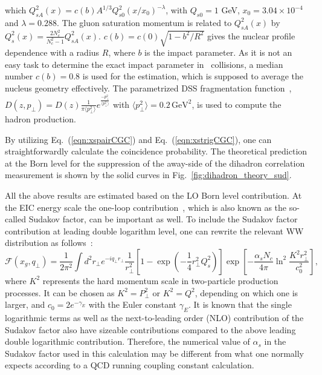 which $Q^{2}_{sA}(x)=c(b)A^{1/3}Q^{2}_{s0}(x/x_{0})^{-\lambda}$, with $Q_{s0}=1$
GeV, $x_{0}=3.04\times 10^{-4}$ and  $\lambda=0.288$. The gluon saturation
momentum is related to $Q^{2}_{sA}(x)$ by
$Q_s^2(x)=\frac{2N_c^2}{N_c^2-1}Q^{2}_{sA}(x)$. $c(b)=c(0)\sqrt{1-b^{2}/R^{2}}$
gives the nuclear profile dependence with a radius $R$, where $b$ is the impact
parameter. As it is not an easy task to determine the exact impact parameter in \eA\
collisions, a median number $c(b)=0.8$ is used for the estimation,
which is supposed to average the nucleus geometry effectively. The parametrized
DSS fragmentation function~\cite{deFlorian:2007aj},
$D(z,p_{\perp})=D(z)\frac{1}{\pi\langle
p^{2}_{\perp}\rangle}e^{\frac{-p_{\perp}^{2}}{\langle p^{2}_{\perp}\rangle}}$ with
$\langle p^{2}_{\perp}\rangle=0.2 \, \mathrm{GeV}^{2}$, is used to compute the hadron
production.

By utilizing Eq.~(\ref{eqn:xspairCGC}) and Eq.~(\ref{eqn:xstrigCGC}), one can
straightforwardly calculate the coincidence probability. The theoretical
prediction at the Born level for the suppression of the away-side of the
dihadron correlation measurement is shown by the solid curves in
Fig.~\ref{fig:dihadron_theory_sud}.

All the above results are estimated based on the LO Born level
contribution. At the EIC energy scale the one-loop
contribution~\cite{Mueller:2012uf}, which is also known as the so-called Sudakov
factor, can be important as well. To include the Sudakov factor contribution at
leading double logarithm level, one can rewrite the relevant WW distribution as
follows~\cite{Mueller:2013wwa}:
\begin{equation}
\mathcal{F}(x_{g}, q_{\perp}) =
\frac{1}{2\pi^{2}} \int d^{2}r_{\perp} e^{-iq_{\perp}r_{\perp}}
\frac{1}{r^{2}_{\perp}}[1-\exp(-\frac{1}{4}r^{2}_{\perp}Q^{2}_{s})]
\exp[-\frac{\alpha_sN_c}{4\pi}\ln^2\frac{K^2r_{\perp}^2}{c^2_0}],
\label{eqn:Sudakov}
\end{equation}
where $K^2$ represents the hard momentum scale in two-particle production
processes. It can be chosen as $K^2=P^2_{\perp}$ or $K^2=Q^2$, depending on which
one is larger, and $c_0=2e^{-\gamma_E}$ with the Euler constant $\gamma_E$. It
is known that the single logarithmic terms as well as the next-to-leading order
(NLO) contribution of the Sudakov factor also have sizeable contributions 
compared to the above leading double logarithmic contribution. Therefore, the
numerical value of $\alpha_s$ in the Sudakov factor used in this calculation may
be different from what one normally expects according to a QCD running coupling
constant calculation.

